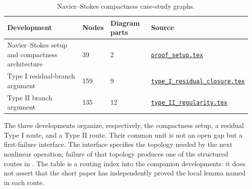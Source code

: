 \documentclass[11pt,reqno]{amsart}
\theoremstyle{plain}
\theoremstyle{definition}
\theoremstyle{remark}
\numberwithin{equation}{section}
\newcommand{\sourcebase}{https://github.com/FragileTech/hypostructure/blob/main/to_formalize}
\begin{document}
\begin{table}[H]
\caption{Navier--Stokes compactness case-study graphs.}
\label{tab:full-instances}
\centering
\small
\begin{tabularx}{\textwidth}{@{}Y L{0.13\textwidth}L{0.15\textwidth}Y@{}}
\toprule
Development & Nodes & Diagram parts & Source \\
\midrule
Navier--Stokes setup and compactness architecture & 39 & 2 &
\href{\sourcebase/proof_setup.tex}{\texttt{proof\_setup.tex}} \\
Type I residual-branch argument & 159 & 9 &
\href{\sourcebase/type_I_residual_closure.tex}{\texttt{type\_I\_residual\_closure.tex}} \\
Type II branch argument & 135 & 12 &
\href{\sourcebase/type_II_regularity.tex}{\texttt{type\_II\_regularity.tex}} \\
\bottomrule
\end{tabularx}
\end{table}

The three developments organize, respectively, the compactness setup, a
residual Type I route, and a Type II route.  Their common unit is not an open
gap but a first-failure interface.  The interface specifies the topology needed
by the next nonlinear operation; failure of that topology produces one of the
structured routes in .  The table is a routing
index into the companion developments: it does not assert that the short paper
has independently proved the local lemma named in each route.
\end{document}
